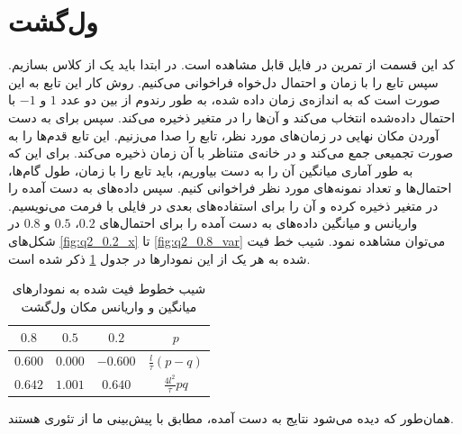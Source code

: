 \documentclass[11pt, a4paper]{article}
\begin{document}
\section{\textbf{ول‌گشت}}
کد این قسمت از تمرین در فایل
قابل مشاهده است.
در ابتدا باید یک
از کلاس
بسازیم.
سپس تابع
را با زمان و احتمال دل‌خواه فراخوانی می‌کنیم.
روش کار این تابع به این صورت است که به اندازه‌ی زمان داده شده،
به طور رندوم از بین دو عدد
$1$
و
$-1$
با احتمال داده‌شده انتخاب می‌کند و آن‌ها را در متغیر
ذخیره می‌کند.
سپس برای به دست آوردن مکان نهایی در زمان‌های مورد نظر، تابع
را صدا می‌زنیم.
این تابع قدم‌ها را به صورت تجمیعی جمع می‌کند و در خانه‌ی متناظر با آن زمان ذخیره می‌کند.
برای این که به طور آماری میانگین آن را به دست بیاوریم،
باید تابع
را با زمان، طول گام‌ها، احتمال‌ها و تعداد نمونه‌های مورد نظر فراخوانی کنیم.
سپس داده‌های به دست آمده را در متغیر
ذخیره کرده و آن را برای استفاده‌های بعدی در فایلی با فرمت
می‌نویسیم.
واریانس و میانگین داده‌های به دست آمده را برای احتمال‌های
$0.2$،
$0.5$
و
$0.8$
در شکل‌های
\ref{fig:q2_0.2_x}
تا
\ref{fig:q2_0.8_var}
می‌توان مشاهده نمود.
شیب خط فیت شده به هر یک از این نمودار‌ها در جدول
\ref{tab:q2_slopes}
ذکر شده است.

\begin{table}[h!]
  \centering
  \begin{tabular}{|c|c|c|c|}
    \hline
    $0.8$ & $0.5$ & $0.2$ & $p$ \\ \hline
    $0.600$ & $0.000$ & $-0.600$ & $\frac{l}{\tau} (p - q)$ \\ \hline
    $0.642$ & $1.001$ & $0.640$ & $\frac{4l^2}{\tau} pq$ \\ \hline
  \end{tabular}
  \caption{شیب خطوط فیت شده به نمودار‌های میانگین و واریانس مکان ول‌گشت}
  \label{tab:q2_slopes}
\end{table}

همان‌طور که دیده می‌شود نتایج به دست آمده، مطابق با پیش‌بینی ما از تئوری هستند.
\end{document}
